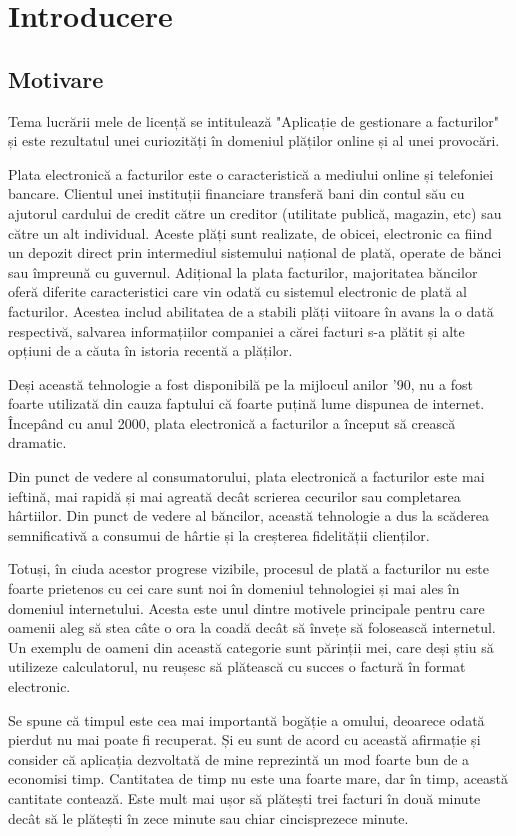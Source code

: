 \documentclass[12pt]{book}
\begin{document}
\chapter{Introducere}
\section{Motivare}
Tema lucrării mele de licență se intitulează "Aplicație de gestionare a facturilor" și este rezultatul unei curiozități în domeniul plăților online și al unei provocări.

Plata electronică a facturilor este o caracteristică a mediului online și telefoniei bancare. Clientul unei instituții financiare transferă bani din contul său cu ajutorul cardului de credit către un creditor (utilitate publică, magazin, etc) sau către un alt individual. Aceste plăți sunt realizate, de obicei, electronic ca fiind un depozit direct prin intermediul sistemului național de plată, operate de bănci sau împreună cu guvernul. Adițional la plata facturilor, majoritatea băncilor oferă diferite caracteristici care vin odată cu sistemul electronic de plată al facturilor. Acestea includ abilitatea de a stabili plăți viitoare în avans la o dată respectivă, salvarea informațiilor companiei a cărei facturi s-a plătit și alte opțiuni de a căuta în istoria recentă a plăților. 

Deși această tehnologie a fost disponibilă pe la mijlocul anilor  '90, nu a fost foarte utilizată din cauza faptului că foarte puțină lume dispunea de internet. Începând cu anul 2000, plata electronică a facturilor a început să crească dramatic. 

Din punct de vedere al consumatorului, plata electronică a facturilor este mai ieftină, mai rapidă și mai agreată decât scrierea cecurilor sau completarea hârtiilor. Din punct de vedere al băncilor, această tehnologie a dus la scăderea semnificativă a consumui de hârtie și la creșterea fidelității clienților.

Totuși, în ciuda acestor progrese vizibile, procesul de plată a facturilor nu este foarte prietenos cu cei care sunt noi în domeniul tehnologiei și mai ales în domeniul internetului. Acesta este unul dintre motivele principale pentru care oamenii aleg să stea câte o ora la coadă decât să învețe să folosească internetul. Un exemplu de oameni din această categorie sunt părinții mei, care deși știu să utilizeze calculatorul, nu reușesc să plătească cu succes o factură în format electronic. 

Se spune că timpul este cea mai importantă bogăție a omului, deoarece odată pierdut nu mai poate fi recuperat. Și eu sunt de acord cu această afirmație și consider că  aplicația dezvoltată de mine reprezintă un mod foarte bun de a economisi timp. Cantitatea de timp nu este una foarte mare, dar în timp, această cantitate contează. Este mult mai ușor să plătești trei facturi în două minute decât să le plătești în zece minute sau chiar cincisprezece minute.
\end{document}
